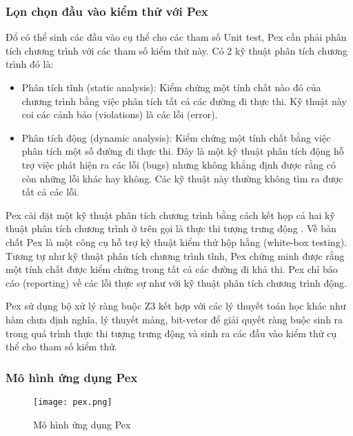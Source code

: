 

\subsubsection*{Lọn chọn đầu vào kiểm thử với Pex}
Đổ có thể sinh các đầu vào cụ thể cho các tham số Unit test, Pex cần phải phân tích chương trình với các tham số kiểm thử này. Có 2 kỹ thuật phân tích chương trình đó là:

\begin{itemize}
	\item Phân tích tĩnh (static analysis): Kiểm chứng một tính chất nào đó của chương trình bằng việc phân tích tất cả các đường đi thực thi. Kỹ thuật này coi các cảnh bảo (violations) là các lỗi (error).
	\item Phân tích động (dynamic analysis): Kiểm chứng một tính chất bằng việc phân tích một số đường đi thực thi. Đây là một kỹ thuật phân tích động hỗ trợ việc phát hiện ra các lỗi (bugs) nhưng không khẳng định được rằng có còn những lỗi khác hay không. Các kỹ thuật này thường không tìm ra được tất cả các lỗi.
\end{itemize}

Pex cài đặt một kỹ thuật phân tích chương trình bằng cách kết họp cả hai kỹ thuật phân tích chương trình ở trên gọi là thực thi tượng trưng động \cite{xie2009fitness, godefroid2005dart}. Về bản chất Pex là một công cụ hỗ trợ kỹ thuật kiểm thử hộp hắng (white-box testing). Tương tự như kỹ thuật phân tích chương trình tĩnh, Pex chứng minh được rằng một tính chất được kiểm chứng trong tất cả các đường đi khả thi. Pex chỉ báo cáo (reporting) về các lỗi thực sự như với kỹ thuật phân tích chương trình động.

Pex sử dụng bộ xử lý ràng buộc Z3 \cite{de2008z3} kết hợp với các lý thuyết toán học khác như hàm chưa định nghĩa, lý thuyết mảng, bit-vetor \cite{kroening2016decision} để giải quyết ràng buộc sinh ra trong quá trình thực thi tượng trưng động và sinh ra các đầu vào kiểm thử cụ thể cho tham số kiểm thử.

\subsubsection*{Mô hình ứng dụng Pex}

\begin{center}
	\begin{figure}[h]
		\begin{center}
			\texttt{[image: pex.png]}
		\end{center}
		\caption{Mô hình ứng dụng Pex}
		
	\end{figure}
\end{center}

